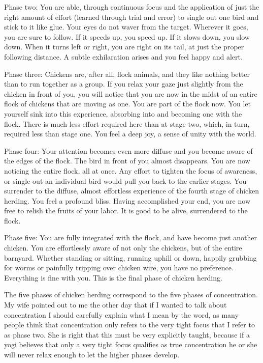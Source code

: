 \documentclass[a5paper,10pt,english]{book}
\begin{document}
\sphinxAtStartPar
Phase two: You are able, through continuous focus and the application of
just the right amount of effort (learned through trial and error) to
single out one bird and stick to it like glue. Your eyes do not waver
from the target. Wherever it goes, you are sure to follow. If it speeds
up, you speed up. If it slows down, you slow down. When it turns left or
right, you are right on its tail, at just the proper following distance.
A subtle exhilaration arises and you feel happy and alert.

\sphinxAtStartPar
Phase three: Chickens are, after all, flock animals, and they like
nothing better than to run together as a group. If you relax your gaze
just slightly from the chicken in front of you, you will notice that you
are now in the midst of an entire flock of chickens that are moving as
one. You are part of the flock now. You let yourself sink into this
experience, absorbing into and becoming one with the flock. There is
much less effort required here than at stage two, which, in turn,
required less than stage one. You feel a deep joy, a sense of unity
with the world.

\sphinxAtStartPar
Phase four: Your attention becomes even more diffuse and you become
aware of the edges of the flock. The bird in front of you almost
disappears. You are now noticing the entire flock, all at once. Any
effort to tighten the focus of awareness, or single out an individual
bird would pull you back to the earlier stages. You surrender to the
diffuse, almost effortless experience of the fourth stage of chicken
herding. You feel a profound bliss. Having accomplished your end, you
are now free to relish the fruits of your labor. It is good to be alive,
surrendered to the flock.

\sphinxAtStartPar
Phase five: You are fully integrated with the flock, and have become
just another chicken. You are effortlessly aware of not only the
chickens, but of the entire barnyard. Whether standing or sitting,
running uphill or down, happily grubbing for worms or painfully
tripping over chicken wire, you have no preference. Everything is fine
with you. This is the final phase of chicken herding.

\sphinxAtStartPar
The five phases of chicken herding correspond to the five phases of
concentration. My wife pointed out to me the other day that if I wanted
to talk about concentration I should carefully explain what I mean by
the word, as many people think that concentration only refers to the
very tight focus that I refer to as phase two. She is right that this
must be very explicitly taught, because if a yogi believes that only a
very tight focus qualifies as true concentration he or she will never
relax enough to let the higher phases develop.
\end{document}
